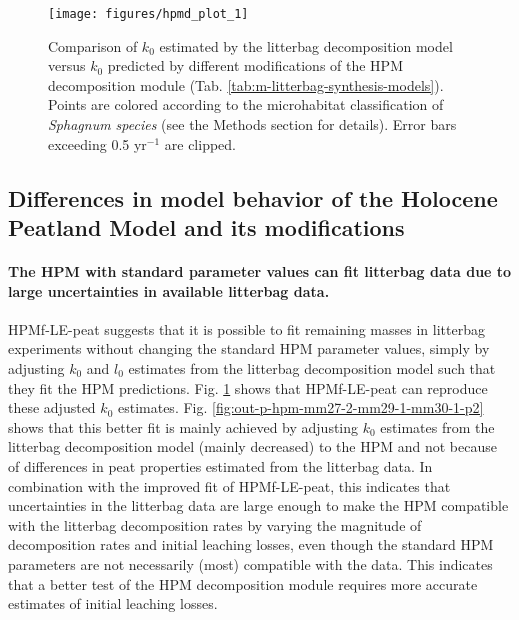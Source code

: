 \documentclass[esd, manuscript]{copernicus}
\begin{document}
\begin{figure}[H]

{\centering \texttt{[image: figures/hpmd\_plot\_1]} 

}

\caption{Comparison of \(k_0\) estimated by the litterbag decomposition model versus \(k_0\) predicted by different modifications of the HPM decomposition module (Tab. \ref{tab:m-litterbag-synthesis-models}). Points are colored according to the microhabitat classification of \emph{Sphagnum species} (see the Methods section for details). Error bars exceeding 0.5 yr\(^{-1}\) are clipped.}\label{fig:out-p-hpm-mm27-2-mm29-1-mm30-1-p1}
\end{figure}

\subsection{Differences in model behavior of the Holocene Peatland Model and its modifications}

\paragraph*{The HPM with standard parameter values can fit litterbag data due to large uncertainties in available litterbag data.}

HPMf-LE-peat suggests that it is possible to fit remaining masses in litterbag experiments without changing the standard HPM parameter values, simply by adjusting \(k_0\) and \(l_0\) estimates from the litterbag decomposition model such that they fit the HPM predictions. Fig. \ref{fig:out-p-hpm-mm27-2-mm29-1-mm30-1-p1} shows that HPMf-LE-peat can reproduce these adjusted \(k_0\) estimates. Fig. \ref{fig:out-p-hpm-mm27-2-mm29-1-mm30-1-p2} shows that this better fit is mainly achieved by adjusting \(k_0\) estimates from the litterbag decomposition model (mainly decreased) to the HPM and not because of differences in peat properties estimated from the litterbag data. In combination with the improved fit of HPMf-LE-peat, this indicates that uncertainties in the litterbag data are large enough to make the HPM compatible with the litterbag decomposition rates by varying the magnitude of decomposition rates and initial leaching losses, even though the standard HPM parameters are not necessarily (most) compatible with the data. This indicates that a better test of the HPM decomposition module requires more accurate estimates of initial leaching losses.
\end{document}
